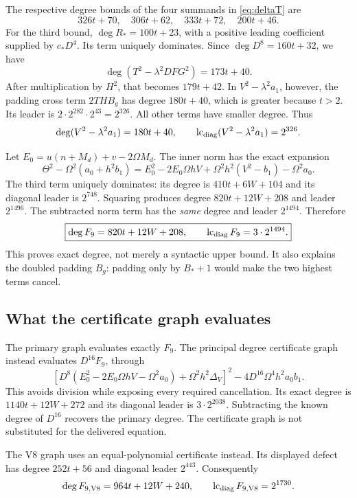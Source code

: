 The respective degree bounds of the four summands in
\eqref{eq:deltaT} are
\[
326t+70,\quad306t+62,\quad333t+72,\quad200t+46.
\]
For the third bound, \(\deg R_*=100t+23\), with a positive leading
coefficient supplied by \(c_*D^4\). Its term uniquely dominates.
Since \(\deg D^8=160t+32\), we have
\[
\deg(T^2-\lambda^2DFG^2)=173t+40.
\]
After multiplication by \(H^2\), that becomes \(179t+42\).
In \(V^2-\lambda^2a_1\), however, the padding cross term \(2THB_g\)
has degree \(180t+40\), which is greater because \(t>2\).
Its leader is
\(2\cdot2^{282}\cdot2^{43}=2^{326}\).
All other terms have smaller degree. Thus
\[
 \deg(V^2-\lambda^2a_1)=180t+40,\qquad
 \operatorname{lc}_{\rm diag}(V^2-\lambda^2a_1)=2^{326}.
\]

Let \(E_0=u(n+M_d)+v-2\Omega M_d\). The inner norm has the exact expansion
\[
 \Theta^2-\Omega^2(a_0+h^2b_1)
 =E_0^2-2E_0\Omega hV
       +\Omega^2h^2(V^2-b_1)-\Omega^2a_0.
\]
The third term uniquely dominates: its degree is \(410t+6W+104\)
and its diagonal leader is \(2^{748}\). Squaring produces degree
\(820t+12W+208\) and leader \(2^{1496}\).
The subtracted norm term has the \emph{same} degree and leader
\(2^{1494}\). Therefore
\[
 \boxed{\deg F_9=820t+12W+208,\qquad
        \operatorname{lc}_{\rm diag}F_9=3\cdot2^{1494}.}
\]
This proves exact degree, not merely a syntactic upper bound.
It also explains the doubled padding \(B_g\): padding only by \(B_*+1\)
would make the two highest terms cancel.

\subsection{What the certificate graph evaluates}
The primary graph evaluates exactly \(F_9\). The principal degree
certificate graph instead evaluates \(D^{16}F_9\), through
\[
 \left[
 D^8(E_0^2-2E_0\Omega hV-\Omega^2a_0)
 +\Omega^2h^2\Delta_V
 \right]^2
 -4D^{16}\Omega^4h^2a_0b_1.
\]
This avoids division while exposing every required cancellation.
Its exact degree is \(1140t+12W+272\) and its diagonal leader is
\(3\cdot2^{2038}\). Subtracting the known degree of \(D^{16}\)
recovers the primary degree. The certificate graph is not substituted
for the delivered equation.

The V8 graph uses an equal-polynomial certificate instead. Its displayed
defect has degree \(252t+56\) and diagonal leader \(2^{443}\).
Consequently
\[
 \deg F_{9,\mathrm{V8}}=964t+12W+240,\qquad
 \operatorname{lc}_{\rm diag}F_{9,\mathrm{V8}}=2^{1730}.
\]

